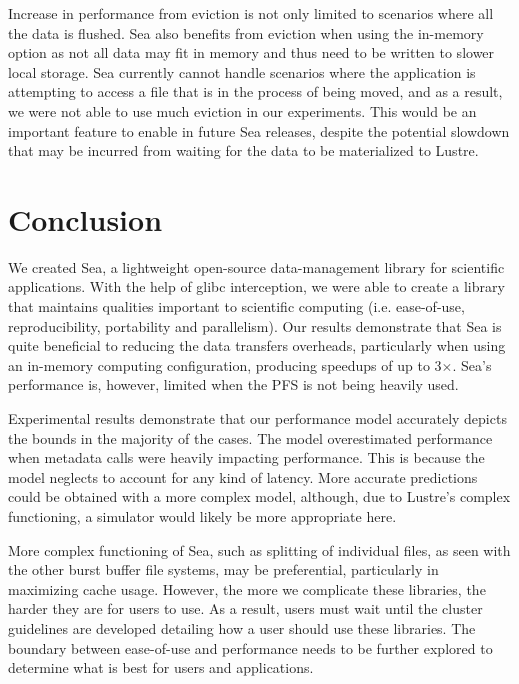 \documentclass[10pt,journal,compsoc]{IEEEtran}
\begin{document}
    Increase in performance from eviction is not only limited to scenarios where
    all the data is flushed. Sea also benefits from eviction when using the
    in-memory option as not all data may fit in memory and thus need to be
    written to slower local storage. Sea currently cannot handle scenarios where
    the application is attempting to access a file that is in the process of
    being moved, and as a result, we were not able to use much eviction in our
    experiments. This would be an important feature to enable in future Sea
    releases, despite the potential slowdown that may be incurred from waiting
    for the data to be materialized to Lustre.

\section{Conclusion}
    We created Sea, a lightweight open-source data-management library for
    scientific applications. With the help of glibc interception, we were able
    to create a library that maintains qualities important to scientific computing
    (i.e. ease-of-use, reproducibility, portability and parallelism). Our
    results demonstrate that Sea is quite beneficial to reducing the data
    transfers overheads, particularly when using an in-memory computing
    configuration, producing speedups of up to 3$\times$. Sea's performance is,
    however, limited when the PFS is not being heavily used.

    Experimental results demonstrate that our performance model accurately
    depicts the bounds in the majority of the cases. The model overestimated
    performance when metadata calls were heavily impacting performance. This is
    because the model neglects to account for any kind of latency. More accurate
    predictions could be obtained with a more complex model, although, due to
    Lustre's complex functioning, a simulator would likely be more appropriate
    here.

    More complex functioning of Sea, such as splitting of individual files, as
    seen with the other burst buffer file systems, may be preferential,
    particularly in maximizing cache usage. However, the more we complicate
    these libraries, the harder they are for users to use. As a result, users
    must wait until the cluster guidelines are developed detailing how a user
    should use these libraries. The boundary between ease-of-use and performance
    needs to be further explored to determine what is best for users and
    applications.
\end{document}
